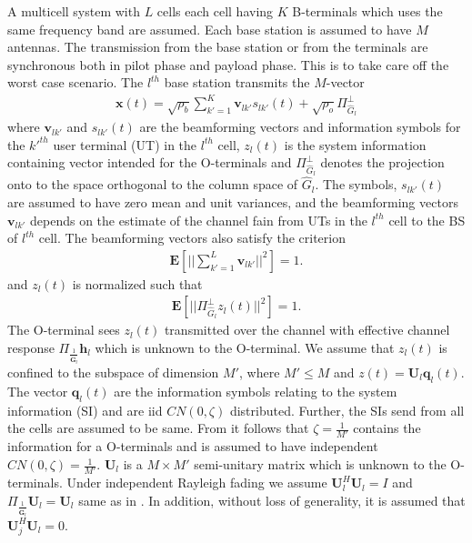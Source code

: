 \documentclass[10pt, a4paper, twoside,fleqn]{article}
\begin{document}
	A multicell system with $L$ cells each cell having $K$ B-terminals which uses the same frequency band are assumed. Each base station is assumed to have $M$ antennas. The transmission from the base station or from the terminals are synchronous both in pilot phase and payload phase. This is to take care off the worst case scenario. The $l^{th}$ base station transmits the $M$-vector
\begin{eqnarray}
	\pmb{x}(t) = \sqrt{\rho_b}\sum\limits_{k'=1}^{K}\boldsymbol{v}_{lk'}s_{lk'}(t)
    		      + \sqrt{\rho_o}\Pi^{\perp}_{{\widehat{G}_l}}
\end{eqnarray}
where $\pmb{v}_{lk'}$ and $s_{lk'}(t)$ are the beamforming vectors and information symbols for the $k'^{th}$ user terminal (UT) in the $l^{th}$ cell, $z_l(t)$ is the system information containing vector intended for the O-terminals and $\Pi^{\perp}_{{\widehat{G}_l}}$ denotes the projection onto to the space orthogonal to the column space of $\hat G_l$. The symbols, $s_{lk'}(t)$ are assumed to have zero mean and unit variances, and the beamforming vectors $\pmb{v}_{lk'}$ depends on the estimate of the channel fain from UTs in the $l^{th}$ cell to the BS of $l^{th}$ cell. 
The beamforming vectors also satisfy the criterion
\begin{eqnarray}
	\pmb{E}\left[||\sum\limits_{k'=1}^{L}\pmb{v}_{lk'}||^2\right]=1.
\end{eqnarray}
and $z_l(t)$ is normalized such that
\begin{eqnarray}\label{eqn:zlcondition}
	\pmb{E}\left[||\Pi^{\perp}_{{\widehat{G}_l}}z_l(t)||^2\right]=1.
\end{eqnarray}
The O-terminal sees $z_l(t)$ transmitted over the channel with effective channel response $\Pi_{\frac{1}{\pmb{\hat G}_l}}\pmb{h}_l$ which is unknown to the O-terminal. We assume that $z_l(t)$ is confined to the subspace of dimension $M'$, where $M'\leq M$ and $z(t) = \pmb{U}_l\pmb{q}_l(t)$. The vector $\pmb{q}_l(t)$ are the information symbols relating to the system information (SI) and are iid $CN(0,\zeta)$ distributed. Further, the SIs send from all the cells are assumed to be same. From \cite{bib:jbb} it follows that $\zeta=\frac{1}{M'}$ contains the information for a O-terminals  and is assumed to have independent $CN(0, \zeta)=\frac{1}{M'}$. $\pmb{U}_l$ is a $M\times M'$ semi-unitary matrix which is unknown to the O-terminals. Under independent Rayleigh fading we assume $\pmb{U}_l^H\pmb{U}_l=I$ and $\Pi_{\frac{1}{\pmb{\hat G}_l}}\pmb{U}_l=\pmb{U}_l$ same as in \cite{bib:jbb}. In addition, without loss of generality, it is assumed that $\pmb{U}_j^H\pmb{U}_l=0$.
\end{document}
